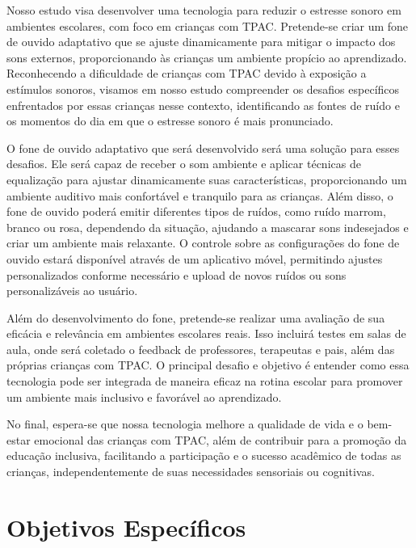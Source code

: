 Nosso estudo visa desenvolver uma tecnologia para reduzir o estresse sonoro em ambientes escolares,  
com foco em crianças com TPAC.  
Pretende-se criar um fone de ouvido adaptativo que se ajuste dinamicamente para mitigar o impacto dos sons externos,  
proporcionando às crianças um ambiente propício ao aprendizado. Reconhecendo a dificuldade de crianças com TPAC  
devido à exposição a estímulos sonoros, visamos em nosso estudo compreender os desafios específicos enfrentados  
por essas crianças nesse contexto, identificando as fontes de ruído e os momentos do dia em que o estresse sonoro é mais pronunciado.

O fone de ouvido adaptativo que será desenvolvido será uma solução para esses desafios.  
Ele será capaz de receber o som ambiente e aplicar técnicas de equalização para ajustar dinamicamente suas características,  
proporcionando um ambiente auditivo mais confortável e tranquilo para as crianças. Além disso, o fone de ouvido poderá emitir  
diferentes tipos de ruídos, como ruído marrom, branco ou rosa, dependendo da situação, ajudando a mascarar sons indesejados  
e criar um ambiente mais relaxante. O controle sobre as configurações do fone de ouvido estará disponível através de um aplicativo móvel,  
permitindo ajustes personalizados conforme necessário e upload de novos ruídos ou sons personalizáveis ao usuário.

Além do desenvolvimento do fone, pretende-se realizar uma avaliação de sua eficácia e relevância em ambientes escolares reais.  
Isso incluirá testes em salas de aula, onde será coletado o feedback de professores, terapeutas e pais,  
além das próprias crianças com TPAC. O principal desafio e objetivo é entender como essa tecnologia pode ser integrada  
de maneira eficaz na rotina escolar para promover um ambiente mais inclusivo e favorável ao aprendizado.

No final, espera-se que nossa tecnologia melhore a qualidade de vida e o bem-estar emocional das crianças com TPAC,  
além de contribuir para a promoção da educação inclusiva, facilitando a participação e o sucesso acadêmico de todas as crianças,  
independentemente de suas necessidades sensoriais ou cognitivas.

\section*{Objetivos Específicos}

